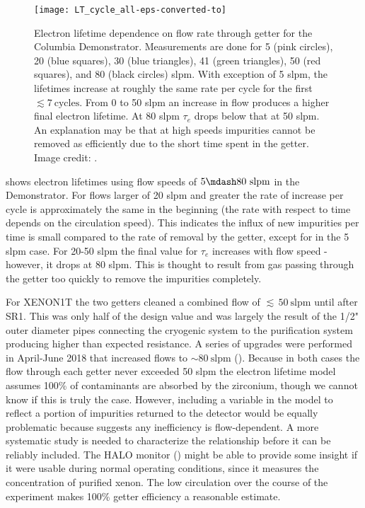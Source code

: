 \begin{figure}
\centering
\texttt{[image: LT\_cycle\_all-eps-converted-to]}
\caption[Electron lifetime dependence on flow rate through getter for the Columbia Demonstrator.  Measurements are done for 5, 20, 30, 41,
50, and 80 slpm.]{Electron lifetime dependence on flow rate through getter for the Columbia Demonstrator.  Measurements are done for 5 (pink
circles), 20 (blue squares), 30 (blue
triangles), 41 (green triangles), 50 (red squares), and 80 (black circles) slpm.  With exception of 5 slpm, the lifetimes increase
at roughly the same rate per cycle for the first $\lesssim 7\ \mathrm{cycles}$.  From 0 to 50 slpm an increase in flow produces a higher
final electron
lifetime.  At 80 slpm $\tau_e$ drops below that at 50 slpm.  An explanation may be that at high speeds impurities cannot be removed as
efficiently due to the short time spent in the getter.  Image credit: .}
\label{fig:electron_lifetime_model_removal_demonstrator_circ}
\end{figure}

 shows electron lifetimes using flow speeds of $5 \mdash 80\ \mathrm{slpm}$
in the Demonstrator.  For flows larger of 20 slpm and greater the rate of increase per cycle is approximately the same in the beginning
(the rate with respect to time depends on the circulation speed).  This indicates the influx of new impurities per time is small
compared to the rate of removal by the getter, except for in the 5 slpm case.  For 20-50 slpm the final
value for $\tau_e$ increases with flow speed - however, it drops at 80 slpm.  This is thought
to result from gas passing through the getter too quickly to remove the impurities completely.

For XENON1T the two getters cleaned a combined flow of ${\lesssim}\, 50\ \mathrm{slpm}$ until after SR1.  This was only half of the design
value and was largely the result of the 1/2" outer diameter pipes connecting the cryogenic system to the purification system producing
higher than expected
resistance.  A series of upgrades were performed in April-June 2018 that increased flows to ${\sim} 80\ \mathrm{slpm}$
().  Because in both cases the flow through each getter never exceeded 50 slpm the electron
lifetime model assumes 100\% of contaminants are absorbed by the zirconium, though we cannot know if this is truly the case.  However,
including a variable in the model to reflect a portion of impurities returned
to the detector would be equally problematic because  suggests any
inefficiency is
flow-dependent.  A more systematic study is needed to characterize the relationship before it can be reliably included.  The HALO
monitor () might be able to provide some insight if it were usable during normal operating conditions, since it
measures the  concentration of purified xenon.  The low
circulation over the course of the experiment makes 100\% getter efficiency a reasonable estimate.

